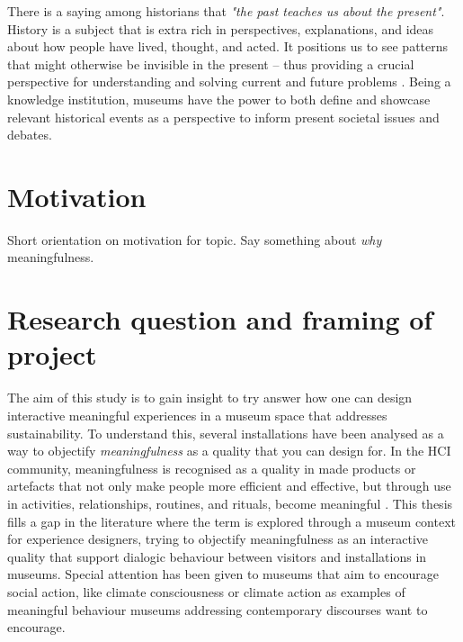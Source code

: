 There is a saying among historians that \emph{"the past teaches us about the present"}. History is a subject that is extra rich in perspectives, explanations, and ideas about how people have lived, thought, and acted. It positions us to see patterns that might otherwise be invisible in the present – thus providing a crucial perspective for understanding and solving current and future problems \autocite{UW_website}. Being a knowledge institution, museums have the power to both define and showcase relevant historical events as a perspective to inform present societal issues and debates. 



\section{Motivation}
Short orientation on motivation for topic. Say something about \emph{why} meaningfulness.


\section{Research question and framing of project}
The aim of this study is to gain insight to try answer how one can design interactive meaningful experiences in a museum space that addresses sustainability. To understand this, several installations have been analysed as a way to objectify \emph{meaningfulness} as a quality that you can design for. In the HCI community, meaningfulness is recognised as a quality in made products or artefacts that not only make people more efficient and effective, but through use in activities, relationships, routines, and rituals, become meaningful \autocite{zimmerman_designing_2009}. This thesis fills a gap in the literature where the term is explored through a museum context for experience designers, trying to objectify meaningfulness as an interactive quality that support dialogic behaviour between visitors and installations in museums. Special attention has been given to museums that aim to encourage social action, like climate consciousness or climate action as examples of meaningful behaviour museums addressing contemporary discourses want to encourage.

